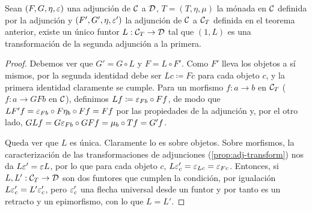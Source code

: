 \begin{theorem}
  Sean $(F,G,\eta,\varepsilon)$ una adjunción de $\mathcal{C}$ a $\mathcal{D}$, $T=(T,\eta,\mu)$ la
  mónada en $\mathcal{C}$ definida por la adjunción y $(F',G',\eta,\varepsilon')$ la adjunción
  de $\mathcal{C}$ a $\mathcal{C}_T$ definida en el teorema anterior, existe un único funtor
  $L:\mathcal{C}_T\to\mathcal{D}$ tal que $(1,L)$ es una transformación de la segunda adjunción
  a la primera.
\end{theorem}
\begin{proof}
  Debemos ver que $G'=G\circ L$ y $F=L\circ F'$. Como $F'$ lleva los objetos a
  sí mismos, por la segunda identidad debe ser $Lc\coloneqq Fc$ para cada objeto
  $c$, y la primera identidad claramente se cumple. Para un morfismo $f:a\to b$
  en $\mathcal{C}_T$ ($f:a\to GFb$ en $\mathcal{C}$), definimos $Lf\coloneqq\varepsilon_{Fb}\circ Ff$,
  de modo que $LF'f=\varepsilon_{Fb}\circ F\eta_b\circ Ff=Ff$ por las propiedades de la
  adjunción y, por el otro lado, $GLf=G\varepsilon_{Fb}\circ GFf=\mu_b\circ Tf=G'f$.

  Queda ver que $L$ es única. Claramente lo es sobre objetos. Sobre morfismos,
  la caracterización de las transformaciones de adjunciones
  (\ref{prop:adj-transform}) nos da $L\varepsilon'=\varepsilon L$, por lo que para cada objeto
  $c$, $L\varepsilon'_c=\varepsilon_{Lc}=\varepsilon_{Fc}$. Entonces, si $L,L':\mathcal{C}_T\to\mathcal{D}$ son dos
  funtores que cumplen la condición, por igualación $L\varepsilon'_c=L'\varepsilon'_c$, pero
  $\varepsilon'_c$ una flecha universal desde un funtor y por tanto es un retracto y un
  epimorfismo, con lo que $L=L'$.
\end{proof}

